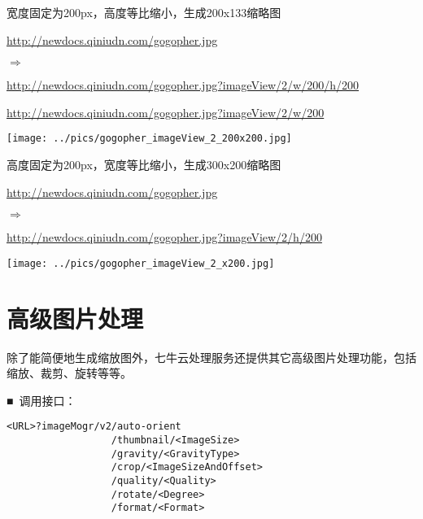 \documentclass[11pt, oneside]{book}
\newcommand{\qsym}[1]{
\footnotesize
\noindent
#1\par
\normalsize
}
\newcommand{\qpara}[1]{
\vspace{0.3em}
\noindent
#1\par
\vspace{0.3em}
}
\newcommand{\qsamplelink}[1]{
\vspace{0.2em}
\noindent
#1\par
\vspace{0.1em}
}
\newcommand{\qurl}[1]{\footnotesize\url{#1}\normalsize}
\begin{document}
\begin{sample}
  \caption{宽度固定为200px，高度等比缩小，生成200x133缩略图}
    \qsamplelink{\qurl{http://newdocs.qiniudn.com/gogopher.jpg}}
    \qsym{$\Rightarrow$}
    \qsamplelink{\qurl{http://newdocs.qiniudn.com/gogopher.jpg?imageView/2/w/200/h/200}}
    \qsamplelink{\qurl{http://newdocs.qiniudn.com/gogopher.jpg?imageView/2/w/200}}

    \begin{center}
      \texttt{[image: ../pics/gogopher\_imageView\_2\_200x200.jpg]}
    \end{center}
  \label{imageView-2-200x200}
\end{sample}

\begin{sample}
  \caption{高度固定为200px，宽度等比缩小，生成300x200缩略图}
    \qsamplelink{\qurl{http://newdocs.qiniudn.com/gogopher.jpg}}
    \qsym{$\Rightarrow$}
    \qsamplelink{\qurl{http://newdocs.qiniudn.com/gogopher.jpg?imageView/2/h/200}}

    \begin{center}
      \texttt{[image: ../pics/gogopher\_imageView\_2\_x200.jpg]}
    \end{center}
  \label{imageView-2-x200}
\end{sample}

\clearpage

\section{高级图片处理}

\qpara{除了能简便地生成缩放图外，七牛云处理服务还提供其它高级图片处理功能，包括缩放、裁剪、旋转等等。}
\qpara{■\ 调用接口：}
\begin{lstlisting}
<URL>?imageMogr/v2/auto-orient
                  /thumbnail/<ImageSize>
                  /gravity/<GravityType>
                  /crop/<ImageSizeAndOffset>
                  /quality/<Quality>
                  /rotate/<Degree>
                  /format/<Format>
\end{lstlisting}
\end{document}
